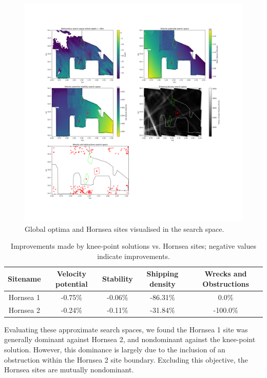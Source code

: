 \documentclass[preprint,12pt]{elsarticle}
\begin{document}
\begin{figure}[htp!]
    \includegraphics[width=\textwidth,height=\textheight,keepaspectratio]{images/all_results_visualisations.png}
    \caption{Global optima and Hornsea sites visualised in the search space.}
    \label{fig:all_results_visualisations}
\end{figure}

\newpage
\begin{table}[h!]
    \centering
    \begin{tabular}{||c|c|c|c|c||}
        \hline
        Sitename & Velocity potential & Stability & Shipping density & Wrecks and Obstructions \\
        \hline
        Hornsea 1 & -0.75\% & -0.06\% & -86.31\% & 0.0\% \\
        \hline
        Hornsea 2 & -0.24\% & -0.11\% & -31.84\% & -100.0\% \\
        \hline
    \end{tabular}
    \caption{Improvements made by knee-point solutions vs. Hornsea sites; negative values indicate improvements.}
    \label{table:kneepoint_percentage_improvements}
\end{table}

Evaluating these approximate search spaces, we found the Hornsea 1 site was generally dominant against Hornsea 2, and nondominant against the knee-point solution. However, this dominance is largely due to the inclusion of an obstruction within the Hornsea 2 site boundary. Excluding this objective, the Hornsea sites are mutually nondominant.
\end{document}

